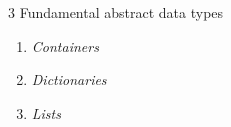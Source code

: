 3 Fundamental abstract data types

\begin{enumerate}
	\item \emph{Containers}
	\item \emph{Dictionaries}
	\item \emph{Lists}
\end{enumerate}